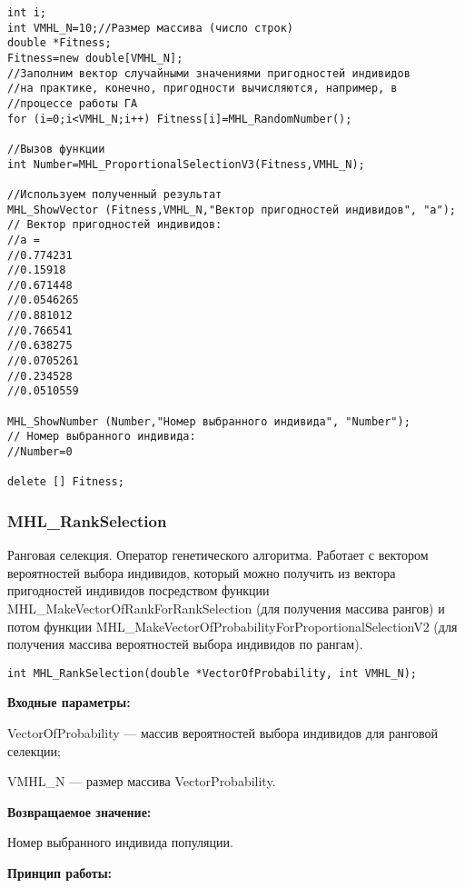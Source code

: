 \documentclass[a4paper,12pt]{article}
\begin{document}
\begin{lstlisting}[label=code_use_MHL_ProportionalSelectionV3,caption=Пример использования]
int i;
int VMHL_N=10;//Размер массива (число строк)
double *Fitness;
Fitness=new double[VMHL_N];
//Заполним вектор случайными значениями пригодностей индивидов
//на практике, конечно, пригодности вычисляются, например, в
//процессе работы ГА
for (i=0;i<VMHL_N;i++) Fitness[i]=MHL_RandomNumber();

//Вызов функции
int Number=MHL_ProportionalSelectionV3(Fitness,VMHL_N);

//Используем полученный результат
MHL_ShowVector (Fitness,VMHL_N,"Вектор пригодностей индивидов", "a");
// Вектор пригодностей индивидов:
//a =	
//0.774231
//0.15918
//0.671448
//0.0546265
//0.881012
//0.766541
//0.638275
//0.0705261
//0.234528
//0.0510559

MHL_ShowNumber (Number,"Номер выбранного индивида", "Number");
// Номер выбранного индивида:
//Number=0

delete [] Fitness;
\end{lstlisting}

\subsubsection{MHL\_RankSelection}\label{MHL_RankSelection}

Ранговая селекция. Оператор генетического алгоритма. Работает с вектором вероятностей выбора индивидов, который можно получить из вектора пригодностей индивидов посредством функции MHL\_MakeVectorOfRankForRankSelection (для получения массива рангов) и потом функции MHL\_MakeVectorOfProbabilityForProportionalSelectionV2 (для получения массива вероятностей выбора индивидов по рангам).


\begin{lstlisting}[label=code_syntax_MHL_RankSelection,caption=Синтаксис]
int MHL_RankSelection(double *VectorOfProbability, int VMHL_N);
\end{lstlisting}

\textbf{Входные параметры:}
 
 VectorOfProbability --- массив вероятностей выбора индивидов для ранговой селекции;
 
 VMHL\_N --- размер массива VectorProbability.

\textbf{Возвращаемое значение:} 

 Номер выбранного индивида популяции.

 \textbf{Принцип работы:}
\end{document}
